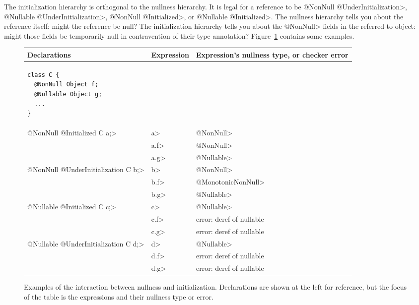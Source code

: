 \begin{sloppypar}
The initialization hierarchy is orthogonal to the nullness hierarchy.  It
is legal for a reference to be \<@NonNull @UnderInitialization>, \<@Nullable @UnderInitialization>,
\<@NonNull @Initialized>, or \<@Nullable @Initialized>.  The nullness hierarchy tells
you about the reference itself:  might the reference be null?  The initialization
hierarchy tells you about the \<@NonNull> fields in the referred-to object:
might those fields be temporarily null in contravention of their
type annotation?
Figure~\ref{fig-initialization-examples} contains some examples.
\end{sloppypar}

\begin{figure}
\begin{tabular}{l|l|l}
Declarations & Expression & Expression's nullness type, or checker error \\ \hline
\begin{minipage}{1.5in}
\begin{Verbatim}
class C {
  @NonNull Object f;
  @Nullable Object g;
  ...
}
\end{Verbatim}
\end{minipage} & & \\ \cline{2-3}
\<@NonNull @Initialized C a;>
& \<a> & \<@NonNull> \\
& \<a.f> & \<@NonNull> \\
& \<a.g> & \<@Nullable> \\ \cline{2-3}
\<@NonNull @UnderInitialization C b;>
& \<b> & \<@NonNull> \\
& \<b.f> & \<@MonotonicNonNull> \\
& \<b.g> & \<@Nullable> \\ \cline{2-3}
\<@Nullable @Initialized C c;>
& \<c> & \<@Nullable> \\
& \<c.f> & error: deref of nullable \\
& \<c.g> & error: deref of nullable \\ \cline{2-3}
\<@Nullable @UnderInitialization C d;>
& \<d> & \<@Nullable> \\
& \<d.f> & error: deref of nullable \\
& \<d.g> & error: deref of nullable \\
\end{tabular}
\caption{Examples of the interaction between nullness and initialization.
  Declarations are shown at the left for reference, but the focus of the
  table is the expressions and their nullness type or error.}
\label{fig-initialization-examples}
\end{figure}


